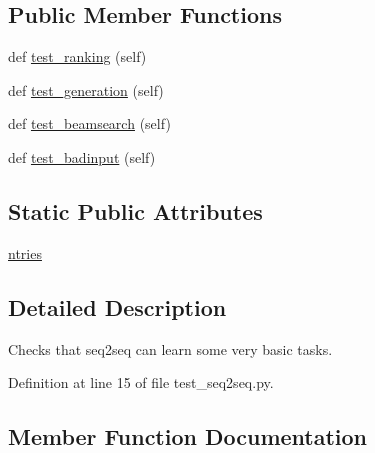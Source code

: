 \subsection*{Public Member Functions}
\begin{DoxyCompactItemize}
\item 
def \hyperlink{classtests_1_1test__seq2seq_1_1TestSeq2Seq_a967d49fc0e124148c7ac4488dd788bc7}{test\+\_\+ranking} (self)
\item 
def \hyperlink{classtests_1_1test__seq2seq_1_1TestSeq2Seq_a203ba54e9671ce31936a202a4e2e6686}{test\+\_\+generation} (self)
\item 
def \hyperlink{classtests_1_1test__seq2seq_1_1TestSeq2Seq_a78cb1bf4c31e8cd73d53e48797b9d7d9}{test\+\_\+beamsearch} (self)
\item 
def \hyperlink{classtests_1_1test__seq2seq_1_1TestSeq2Seq_ab550295b1910a3576b5b0ed9d426f831}{test\+\_\+badinput} (self)
\end{DoxyCompactItemize}
\subsection*{Static Public Attributes}
\begin{DoxyCompactItemize}
\item 
\hyperlink{classtests_1_1test__seq2seq_1_1TestSeq2Seq_a5681e61335c043954e727fa9eb4b1eb3}{ntries}
\end{DoxyCompactItemize}


\subsection{Detailed Description}
\begin{DoxyVerb}Checks that seq2seq can learn some very basic tasks.\end{DoxyVerb}
 

Definition at line 15 of file test\+\_\+seq2seq.\+py.



\subsection{Member Function Documentation}
\mbox{\label{classtests_1_1test__seq2seq_1_1TestSeq2Seq_ab550295b1910a3576b5b0ed9d426f831}} 
